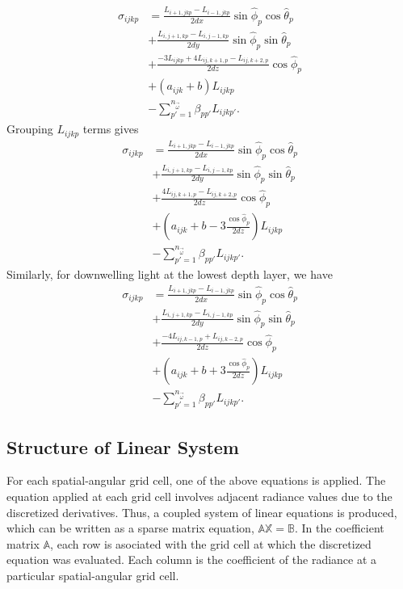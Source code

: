 \begin{equation*}
  \begin{aligned}
    \sigma_{ijkp} &= \frac{L_{i+1,jkp}-L_{i-1,jkp}}{2dx}\sin\hat{\phi}_p\cos\hat{\theta}_p \\
    &+ \frac{L_{i,j+1,kp}-L_{i,j-1,kp}}{2dy}\sin\hat{\phi}_p\sin\hat{\theta}_p \\
    &+ \frac{-3L_{ijkp} + 4L_{ij,k+1,p} - L_{ij,k+2,p}}{2dz}\cos\hat{\phi}_p \\
    &+ (a_{ijk}+b)L_{ijkp} \\
    &- \sum_{p'=1}^{n_{\vec{\omega}}} \beta_{pp'} L_{ijkp'}.
  \end{aligned}
\end{equation*}
Grouping $L_{ijkp}$ terms gives
\begin{equation*}
  \begin{aligned}
    \sigma_{ijkp} &= \frac{L_{i+1,jkp}-L_{i-1,jkp}}{2dx}\sin\hat{\phi}_p\cos\hat{\theta}_p \\
    &+ \frac{L_{i,j+1,kp}-L_{i,j-1,kp}}{2dy}\sin\hat{\phi}_p\sin\hat{\theta}_p \\
    &+ \frac{4L_{ij,k+1,p} - L_{ij,k+2,p}}{2dz}\cos\hat{\phi}_p \\
    &+ \left(a_{ijk}+b - 3\frac{\cos\hat\phi_p}{2dz} \right)L_{ijkp} \\
    &- \sum_{p'=1}^{n_{\vec{\omega}}} \beta_{pp'} L_{ijkp'}.
  \end{aligned}
\end{equation*}
Similarly, for downwelling light at the lowest depth layer, we have
\begin{equation*}
  \begin{aligned}
    \sigma_{ijkp} &= \frac{L_{i+1,jkp}-L_{i-1,jkp}}{2dx}\sin\hat{\phi}_p\cos\hat{\theta}_p \\
    &+ \frac{L_{i,j+1,kp}-L_{i,j-1,kp}}{2dy}\sin\hat{\phi}_p\sin\hat{\theta}_p \\
    &+ \frac{-4L_{ij,k-1,p} + L_{ij,k-2,p}}{2dz}\cos\hat{\phi}_p \\
    &+ \left(a_{ijk}+b + 3\frac{\cos\hat\phi_p}{2dz} \right)L_{ijkp} \\
    &- \sum_{p'=1}^{n_{\vec{\omega}}} \beta_{pp'} L_{ijkp'}.
  \end{aligned}
\end{equation*}

\subsection{Structure of Linear System}
For each spatial-angular grid cell, one of the above equations is applied.
The equation applied at each grid cell involves adjacent radiance values due to the discretized derivatives.
Thus, a coupled system of linear equations is produced, which can be written as a sparse matrix equation, $\mathbb{AX=B}$.
In the coefficient matrix $\mathbb{A}$, each row is asociated with the grid cell at which the discretized equation was evaluated.
Each column is the coefficient of the radiance at a particular spatial-angular grid cell.

